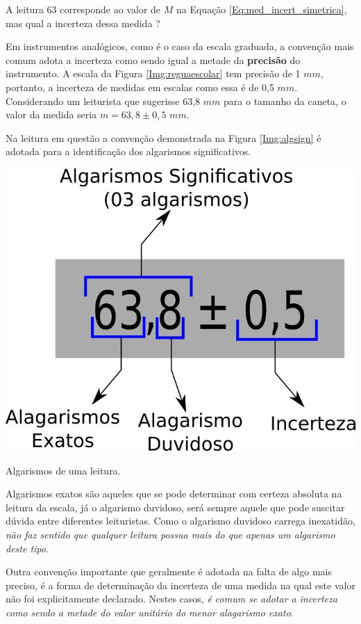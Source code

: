 \documentclass[a4paper, 11pt]{report}
\begin{document}
A leitura 63 corresponde ao valor de $M$ na Equação 
\ref{Eq:med_incert_simetrica}, mas qual a incerteza dessa medida ? 

Em instrumentos analógicos, como é o caso da escala graduada, a convenção mais 
comum adota a incerteza como sendo igual a metade da \textbf{precisão} do 
instrumento. A escala da Figura \ref{Img:reguaescolar} tem precisão de 1 $mm$, 
portanto, a incerteza de medidas em escalas como essa é de 0,5 $mm$. 
Considerando um leiturista que sugerisse 63,8 $mm$ para o tamanho da caneta, 
o valor da medida seria $m = 63,8 \pm 0,5$ $mm$.

Na leitura em questão a convenção demonstrada na Figura \ref{Img:algsign} é 
adotada para a identificação dos algarismos significativos. 

\begin{staticfigure}
    \centering
    \includegraphics[scale=.55]{img/algarismossig.png}
    \caption{\footnotesize Algarismos de uma leitura.}
    \label{Img:algsign}
\end{staticfigure}

Algarismos exatos são aqueles que se pode determinar com certeza absoluta na 
leitura da escala, já o algarismo duvidoso, será sempre aquele que pode 
suscitar dúvida entre diferentes leituristas. Como o algarismo duvidoso 
carrega inexatidão, \emph{não faz sentido que qualquer leitura possua mais do que 
apenas um algarismo deste tipo}.

Outra convenção importante que geralmente é adotada na falta de algo mais 
preciso, é a forma de determinação da incerteza de uma medida na qual este 
valor não foi explicitamente declarado. Nestes casos, \emph{é comum se adotar a 
incerteza como sendo a metade do valor unitário do menor alagarismo exato}.
\end{document}
